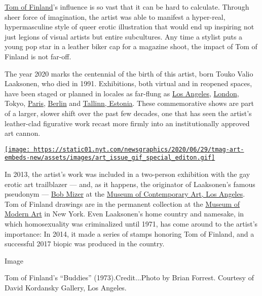 \href{https://www.nytimes.com/2016/02/22/t-magazine/art/robert-mapplethorpe-tom-of-finland.html}{Tom
of Finland}'s influence is so vast that it can be hard to calculate.
Through sheer force of imagination, the artist was able to manifest a
hyper-real, hypermasculine style of queer erotic illustration that would
end up inspiring not just legions of visual artists but entire
subcultures. Any time a stylist puts a young pop star in a leather biker
cap for a magazine shoot, the impact of Tom of Finland is not far-off.

The year 2020 marks the centennial of the birth of this artist, born
Touko Valio Laaksonen, who died in 1991. Exhibitions, both virtual and
in reopened spaces, have been staged or planned in locales as far-flung
as
\href{https://www.nytimes.com/interactive/2015/08/20/t-magazine/los-angeles-city-guide.html}{Los
Angeles},
\href{https://www.nytimes.com/2019/02/15/t-magazine/london-wellness.html}{London},
Tokyo,
\href{https://www.nytimes.com/2019/02/26/t-magazine/paris-wellness.html}{Paris},
\href{https://www.nytimes.com/2018/08/23/t-magazine/berlin-guide.html}{Berlin}
and
\href{https://www.nytimes.com/2018/07/24/travel/tallinn-estonia-vilnius-lithuania-52-places.html}{Tallinn,
Estonia}. These commemorative shows are part of a larger, slower shift
over the past few decades, one that has seen the artist's leather-clad
figurative work recast more firmly into an institutionally approved art
cannon.

\href{https://www.nytimes.com/issue/t-magazine/2020/07/02/true-believers-art-issue}{\texttt{[image: https://static01.nyt.com/newsgraphics/2020/06/29/tmag-art-embeds-new/assets/images/art\_issue\_gif\_special\_editon.gif]}}

In 2013, the artist's work was included in a two-person exhibition with
the gay erotic art trailblazer --- and, as it happens, the originator of
Laaksonen's famous pseudonym --- \href{http://bobmizer.org/}{Bob Mizer}
at the \href{https://www.moca.org/}{Museum of Contemporary Art, Los
Angeles}. Tom of Finland drawings are in the permanent collection at the
\href{https://www.nytimes.com/topic/organization/museum-of-modern-art}{Museum
of Modern Art} in New York. Even Laaksonen's home country and namesake,
in which homosexuality was criminalized until 1971, has come around to
the artist's importance: In 2014, it made a series of stamps honoring
Tom of Finland, and a successful 2017 biopic was produced in the
country.

Image

Tom of Finland's ``Buddies'' (1973).Credit...Photo by Brian Forrest.
Courtesy of David Kordansky Gallery, Los Angeles.

